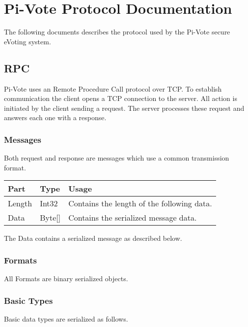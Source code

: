 \documentclass[a4paper]{article}
\title{}
\author{}
\date{2010-11-09T19:50:18.91}
\begin{document}
\section{Pi-Vote Protocol Documentation}
{\sffamily
The following documents describes the protocol used by the Pi-Vote
secure eVoting system.}

\subsection{RPC}
{\sffamily
Pi-Vote uses an Remote Procedure Call protocol over TCP. To establish
communication the client opens a TCP connection to the server. All
action is initiated by the client sending a request. The server
processes these request and answers each one with a response.}

\subsubsection{Messages}
{\sffamily
Both request and response are messages which use a common transmission
format.}

\begin{center}
\tablehead{}
\begin{supertabular}{|m{2.7159998cm}|m{2.225cm}|m{11.459001cm}|}
\hline
\sffamily\bfseries Part &
\sffamily\bfseries Type &
\sffamily\bfseries Usage\\\hline
\sffamily Length &
\sffamily Int32 &
\sffamily Contains the length of the following data.\\\hline
\sffamily Data &
\sffamily Byte[] &
\sffamily Contains the serialized message data.\\\hline
\end{supertabular}
\end{center}

\bigskip

{\sffamily
The Data contains a serialized message as described below.}

\subsubsection{Formats}
{\sffamily
All Formats are binary serialized objects.}

\subsubsection{Basic Types}
{\sffamily
Basic data types are serialized as follows.}
\end{document}
